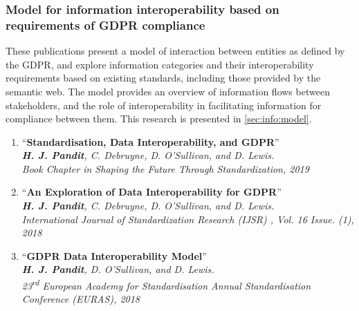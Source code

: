 \subsubsection{Model for information interoperability based on requirements of GDPR compliance}
These publications present a model of interaction between entities as defined by the GDPR, and explore information categories and their interoperability requirements based on existing standards, including those provided by the semantic web.
The model provides an overview of information flows between stakeholders, and the role of interoperability in facilitating information for compliance between them. This research is presented in \autoref{sec:info:model}.
\begin{enumerate}[resume]
    \item ``\textbf{Standardisation, Data Interoperability, and GDPR}'' \cite{pandit_exploration_2018} \\
    \textit{\textbf{H. J. Pandit}, C. Debruyne, D. O’Sullivan, and D. Lewis.} \\ 
    \textit{Book Chapter in Shaping the Future Through Standardization, 2019}
    \item ``\textbf{An Exploration of Data Interoperability for GDPR}'' \cite{pandit_standardisation_2020} \\
    \textit{\textbf{H. J. Pandit}, C. Debruyne, D. O’Sullivan, and D. Lewis.} \\ 
    \textit{International Journal of Standardization Research (IJSR) , Vol. 16 Issue. (1), 2018}
    \item ``\textbf{GDPR Data Interoperability Model}'' \cite{pandit_gdpr_2018} \\
    \textit{\textbf{H. J. Pandit}, D. O’Sullivan, and D. Lewis.} \\ 
    \textit{23\textsuperscript{rd} European Academy for Standardisation Annual Standardisation Conference (EURAS), 2018}
\end{enumerate}

